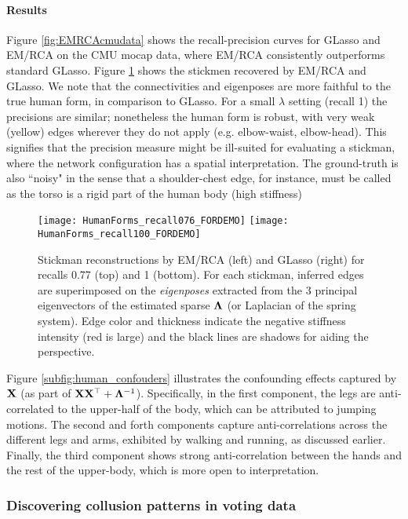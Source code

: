         \paragraph{Results}
        Figure \ref{fig:EMRCAcmudata} shows the recall-precision curves for GLasso and EM/RCA on the CMU mocap data, where EM/RCA consistently outperforms standard GLasso. Figure \ref{fig:CMU_results} shows the stickmen recovered by EM/RCA and GLasso. We note that the connectivities and eigenposes are more faithful to the true human form, in comparison to GLasso. For a small $\lambda$ setting (recall 1) the precisions are similar; nonetheless the human form is robust, with very weak (yellow) edges wherever they do not apply (e.g. elbow-waist, elbow-head). This signifies that the precision measure might be ill-suited for evaluating a stickman, where the network configuration has a spatial interpretation. The ground-truth is also ``noisy" in the sense that a shoulder-chest edge, for instance, must be called as the torso is a rigid part of the human body (high stiffness)
        \begin{figure}[!htbp]
          \centering
          \texttt{[image: HumanForms\_recall076\_FORDEMO]}
          \texttt{[image: HumanForms\_recall100\_FORDEMO]}
          \caption[Stickman reconstructions by EM/RCA and GLasso.]{ \label{fig:CMU_results} Stickman reconstructions by EM/RCA (left) and GLasso (right) for recalls 0.77 (top) and 1 (bottom). For each stickman, inferred edges are superimposed on the \textit{eigenposes} extracted from the 3 principal eigenvectors of the estimated sparse $\mathbf{\Lambda}$ (or Laplacian of the spring system). Edge color and thickness indicate the negative stiffness intensity (red is large) and the black lines are shadows for aiding the perspective.}
        \end{figure}
          
        Figure \ref{subfig:human_confouders} illustrates the confounding effects captured by $\mathbf{X}$ (as part of $\mathbf{X}\mathbf{X}^\top + \mathbf{\Lambda}^{-1}$). Specifically, in the first component, the legs are anti-correlated to the upper-half of the body, which can be attributed to jumping motions. The second and forth components capture anti-correlations across the different legs and arms, exhibited by walking and running, as discussed earlier. Finally, the third component shows strong anti-correlation between the hands and the rest of the upper-body, which is more open to interpretation.
 
 
      \subsubsection{Discovering collusion patterns in voting data} \label{subsubsec:chap5_collusion}
      
